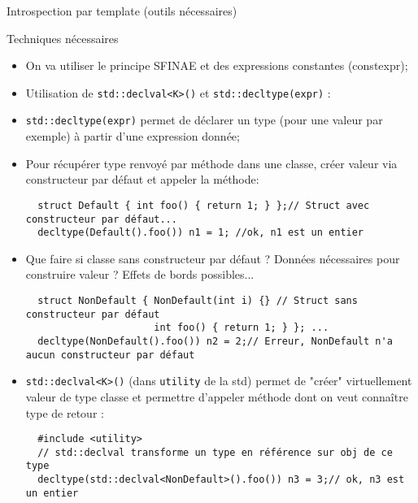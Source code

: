 \documentclass[compress,10pt,aspectratio=169]{beamer}
\begin{document}
\begin{frame}[fragile]{Introspection par template (outils nécessaires)}
  \scriptsize\vspace*{-4mm}
  \begin{block}{\small Techniques nécessaires}
  \vspace*{-1mm}
  \begin{itemize}
  \item On va utiliser le principe SFINAE et des expressions constantes (constexpr);
  \item Utilisation de \texttt{std::declval<K>()} et \texttt{std::decltype(expr)} :
  \item \texttt{std::decltype(expr)} permet de déclarer un type (pour une valeur par exemple)
  à partir d'une expression donnée;
  \item Pour récupérer type renvoyé par méthode dans une classe,
  créer valeur via constructeur par défaut et appeler la méthode:
  \begin{verbatim}
  struct Default { int foo() { return 1; } };// Struct avec constructeur par défaut...
  decltype(Default().foo()) n1 = 1; //ok, n1 est un entier
  \end{verbatim}
  \item Que faire si classe sans constructeur par défaut ? Données nécessaires
        pour construire valeur ? Effets de bords possibles...
  \begin{verbatim}
  struct NonDefault { NonDefault(int i) {} // Struct sans constructeur par défaut
                      int foo() { return 1; } }; ...
  decltype(NonDefault().foo()) n2 = 2;// Erreur, NonDefault n'a aucun constructeur par défaut
  \end{verbatim}
  \item \texttt{std::declval<K>()} (dans \texttt{utility} de la std) permet de "créer" 
  virtuellement valeur de type classe et 
  permettre d'appeler méthode dont on veut connaître type de retour :
  \begin{verbatim}
  #include <utility>
  // std::declval transforme un type en référence sur obj de ce type
  decltype(std::declval<NonDefault>().foo()) n3 = 3;// ok, n3 est un entier
  \end{verbatim}
  \end{itemize}
  \end{block}
  \end{frame}
  
\end{document}
